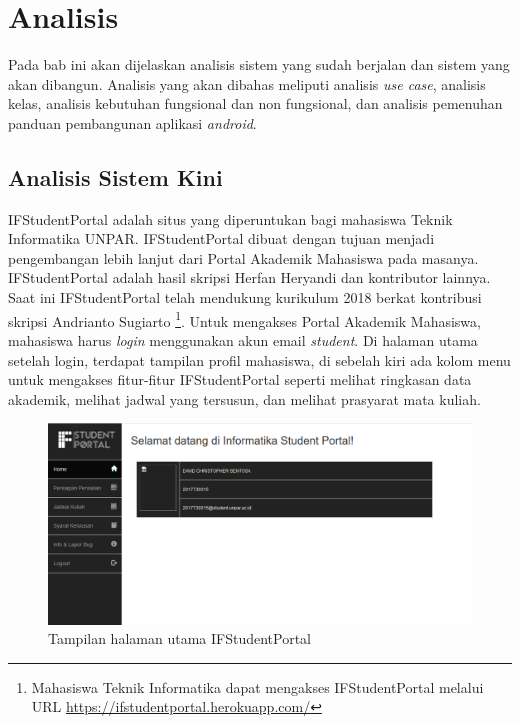 \chapter{Analisis}
\label{chap:analisis}

Pada bab ini akan dijelaskan analisis sistem yang sudah berjalan dan sistem yang akan dibangun. Analisis yang akan dibahas meliputi analisis \textit{use case}, analisis kelas, analisis kebutuhan fungsional dan non fungsional, dan analisis pemenuhan panduan pembangunan aplikasi \textit{android}.

\section{Analisis Sistem Kini}
% 

IFStudentPortal adalah situs yang diperuntukan bagi mahasiswa Teknik Informatika UNPAR\cite{herfan:15:portal}. IFStudentPortal dibuat dengan tujuan menjadi pengembangan lebih lanjut dari Portal Akademik Mahasiswa pada masanya. IFStudentPortal adalah hasil skripsi Herfan Heryandi \cite{herfan:15:portal} dan kontributor lainnya. Saat ini IFStudentPortal telah mendukung kurikulum 2018 berkat kontribusi skripsi Andrianto Sugiarto \cite{andrianto:18:portalsiam}\footnote{Mahasiswa Teknik Informatika dapat mengakses IFStudentPortal melalui URL \url{https://ifstudentportal.herokuapp.com/}}. Untuk mengakses Portal Akademik Mahasiswa, mahasiswa harus \textit{login} menggunakan akun email \textit{student}. Di halaman utama setelah login, terdapat tampilan profil mahasiswa, di sebelah kiri ada kolom menu untuk mengakses fitur-fitur IFStudentPortal seperti melihat ringkasan data akademik, melihat jadwal yang tersusun, dan melihat prasyarat mata kuliah.
\begin{figure}[H]
				\centering
				\includegraphics[scale=0.5]{Gambar/home}
				\caption{Tampilan halaman utama IFStudentPortal} 
				\label{fig:ifstudpor_home}
			\end{figure}
			
